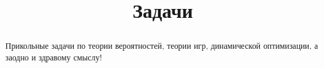 \documentclass[final,pdftex]{../../template/epsilonj}
\begin{document}
\begin{frontmatter}
\title{Задачи}

\begin{aug}
\author{ }%


\address{НИУ ВШЭ, Москва.}
\end{aug}

\begin{abstract}
Прикольные задачи по теории вероятностей, теории игр, динамической оптимизации, а заодно и здравому смыслу!
\end{abstract}

\begin{keyword}
\end{keyword}

\end{frontmatter}


\end{document}
